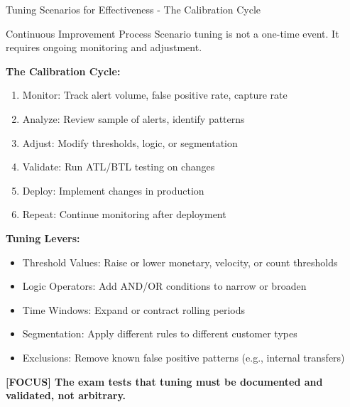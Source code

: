 \documentclass[11pt,a4paper]{beamer}
\newcommand{\examfocus}[1]{\textcolor{orange!80!black}{\textbf{[FOCUS] #1}}}
\begin{document}
	\begin{frame}{Tuning Scenarios for Effectiveness - The Calibration Cycle}
		\begin{block}{Continuous Improvement Process}
			Scenario tuning is not a one-time event. It requires ongoing monitoring and adjustment.
		\end{block}
		
		\textbf{The Calibration Cycle:}
		\begin{enumerate}
			\item Monitor: Track alert volume, false positive rate, capture rate
			\item Analyze: Review sample of alerts, identify patterns
			\item Adjust: Modify thresholds, logic, or segmentation
			\item Validate: Run ATL/BTL testing on changes
			\item Deploy: Implement changes in production
			\item Repeat: Continue monitoring after deployment
		\end{enumerate}
		
		\textbf{Tuning Levers:}
		\begin{itemize}
			\item Threshold Values: Raise or lower monetary, velocity, or count thresholds
			\item Logic Operators: Add AND/OR conditions to narrow or broaden
			\item Time Windows: Expand or contract rolling periods
			\item Segmentation: Apply different rules to different customer types
			\item Exclusions: Remove known false positive patterns (e.g., internal transfers)
		\end{itemize}
		
		\examfocus{The exam tests that tuning must be documented and validated, not arbitrary.}
	\end{frame}
	
\end{document}
